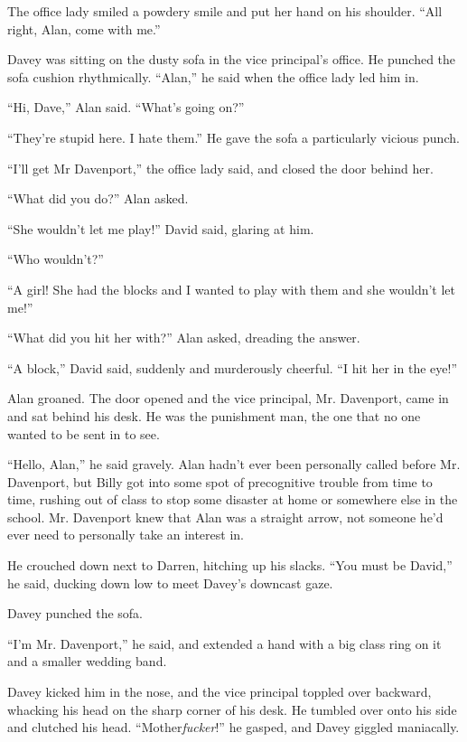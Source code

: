 The office lady smiled a powdery smile and put her hand on his
shoulder.  ``All right, Alan, come with me.''

Davey was sitting on the dusty sofa in the vice principal's office. 
He punched the sofa cushion rhythmically.  ``Alan,'' he said when the
office lady led him in.

``Hi, Dave,'' Alan said.  ``What's going on?''

``They're stupid here.  I hate them.'' He gave the sofa a particularly
vicious punch.

``I'll get Mr Davenport,'' the office lady said, and closed the door
behind her.

``What did you do?'' Alan asked.

``She wouldn't let me play!'' David said, glaring at him.

``Who wouldn't?''

``A girl!  She had the blocks and I wanted to play with them and she
wouldn't let me!''

``What did you hit her with?'' Alan asked, dreading the answer.

``A block,'' David said, suddenly and murderously cheerful.  ``I hit
her in the eye!''

Alan groaned.  The door opened and the vice principal, Mr.  Davenport,
came in and sat behind his desk.  He was the punishment man, the one
that no one wanted to be sent in to see.

``Hello, Alan,'' he said gravely.  Alan hadn't ever been personally
called before Mr.  Davenport, but Billy got into some spot of
precognitive trouble from time to time, rushing out of class to stop
some disaster at home or somewhere else in the school.  Mr.  Davenport
knew that Alan was a straight arrow, not someone he'd ever need to
personally take an interest in.

He crouched down next to Darren, hitching up his slacks.  ``You must
be David,'' he said, ducking down low to meet Davey's downcast gaze.

Davey punched the sofa.

``I'm Mr.  Davenport,'' he said, and extended a hand with a big class
ring on it and a smaller wedding band.

Davey kicked him in the nose, and the vice principal toppled over
backward, whacking his head on the sharp corner of his desk.  He
tumbled over onto his side and clutched his head. 
``Mother\textit{fucker}!'' he gasped, and Davey giggled maniacally.

